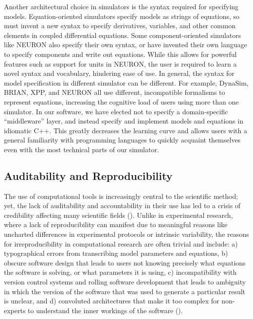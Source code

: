 \documentclass{frontiersSCNS} %
\begin{document}
Another architectural choice in simulators is the syntax required for specifying models. Equation-oriented simulators specify models as strings of equations, so must invent a new syntax to specify derivatives, variables, and other common elements in coupled differential equations. Some component-oriented simulators like NEURON also specify their own syntax, or have invented their own language to specify components and write out equations. While this allows for powerful features such as support for units in NEURON, the user is required to learn a novel syntax and vocabulary, hindering ease of use. In general, the syntax for model specification in different simulator can be different. For example, DynaSim, BRIAN, XPP, and NEURON all use different, incompatible formalisms to represent equations, increasing the cognitive load of users using more than one simulator. In our software, we have elected not to specify a domain-specific ``middleware'' layer, and instead specify and implement models and equations in idiomatic C++. This greatly decreases the learning curve and allows users with a general familiarity with programming languages to quickly acquaint themselves even with the most technical parts of our simulator. 

\subsection{Auditability and Reproducibility}

The use of computational tools is increasingly central to the scientific method; yet, the lack of auditability and accountability in their use has led to a crisis of credibility affecting many scientific fields (\cite{stoddenEnhancingReproducibilityComputational2016, bakerWhyScientistsMust2016}). Unlike in experimental research, where a lack of reproducibility can manifest due to meaningful reasons like uncharted differences in experimental protocols or intrinsic variability, the reasons for irreproducibility in computational research are often trivial and include: a) typographical errors from transcribing model parameters and equations, b) obscure software design that leads to users not knowing precisely what equations the software is solving, or what parameters it is using, c) incompatibility with version control systems and rolling software development that leads to ambiguity in which the version of the software that was used to generate a particular result is unclear, and d) convoluted architectures that make it too complex for non-experts to understand the inner workings of the software (\cite{xuMeasurementSourceCode2017, sedanoCodeReadabilityTesting2016, vikstromStudyAutomaticTranslation2009}).
\end{document}
